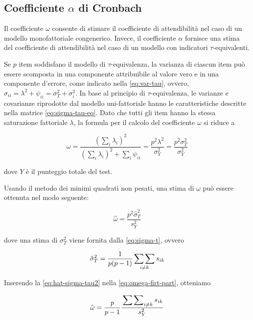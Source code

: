 \documentclass[
  11pt,
]{krantz}
\theoremstyle{definition}
\theoremstyle{definition}
\theoremstyle{definition}
\theoremstyle{definition}
\theoremstyle{remark}
\begin{document}
\hypertarget{coefficiente-alpha-di-cronbach}{%
\subsection{\texorpdfstring{Coefficiente \(\alpha\) di Cronbach}{Coefficiente \textbackslash alpha di Cronbach}}\label{coefficiente-alpha-di-cronbach}}

Il coefficiente \(\omega\) consente di stimare il coefficiente di attendibilità nel caso di un modello monofattoriale congenerico. Invece, il coefficiente \(\alpha\) fornisce una stima del coefficiente di attendibilità nel caso di un modello con indicatori \(\tau\)-equivalenti.

Se \(p\) item soddisfano il modello di \(\tau\)-equivalenza, la varianza di ciascun item può essere scomposta in una componente attribuibile al valore vero e in una componente d'errore, come indicato nella \eqref{eq:var-tau}, ovvero, \(\sigma_{ii} = \lambda^2 + \psi_{ii} =\sigma^2_T + \sigma^2_i\). In base al principio di \(\tau\)-equivalenza, le varianze e covarianze riprodotte dal modello uni-fattoriale hanno le caratteristiche descritte nella matrice \eqref{eq:sigma-tau-eq}. Dato che tutti gli item hanno la stessa saturazione fattoriale \(\lambda\), la formula per il calcolo del coefficiente \(\omega\) si riduce a

\[
\omega = \frac{\left( \sum_i \lambda_i \right)^2}{\left( \sum_i
    \lambda_i \right)^2  + \sum_i \psi_{ii}} = \frac{p^2 \lambda^2}{\sigma^2_Y} = \frac{p^2 \sigma_T^2}{\sigma_Y^2}
\]

dove \(Y\) è il punteggio totale del test.

Usando il metodo dei minimi quadrati non pesati, una stima di \(\omega\) può essere ottenuta nel modo seguente:

\begin{equation}
\hat{\omega} = \frac{p^2 \hat{\sigma}_T^2}{s_Y^2}
\label{eq:omega-firt-part}
\end{equation}

dove una stima di \(\sigma_T^2\) viene fornita dalla \eqref{eq:sigma-t}, ovvero

\begin{equation}
\hat{\sigma}_T^2 = \frac{1}{p(p-1)} \sideset{}{} {\sum \sum}_{i \neq k} s_{ik}
\label{eq:hat-sigma-tau2}
\end{equation}

Inserendo la \eqref{eq:hat-sigma-tau2} nella \eqref{eq:omega-firt-part}, otteniamo

\begin{equation}
\hat{\omega} = \frac{p}{p-1}\frac{\sideset{}{} {\sum \sum}_{i \neq k} s_{ik}}{s_Y^2}
\end{equation}
\end{document}
